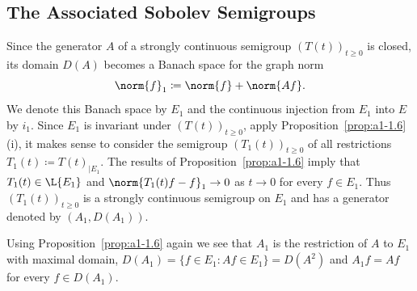 \subsection{The Associated Sobolev Semigroups}\label{subsec:a1-3.6}%
Since the generator $A$ of a strongly continuous semigroup $(T(t))_{t\geq 0}$ is closed, its domain $D(A)$ becomes a Banach space for the graph norm
\[
    \norm{f}_{1} \coloneqq \norm{f} + \norm{Af} .
\]
We denote this Banach space by $E_{1}$ and the continuous injection from $E_{1}$ into $E$ by $i_{1}$.
Since $E_{1}$ is invariant under $(T(t))_{t\geq 0}$, apply Proposition~\ref{prop:a1-1.6}\,(i), it makes sense to consider the semigroup $(T_{1}(t))_{t\geq 0}$ of all restrictions $T_{1}(t) \coloneqq T(t)_{\vert E_{1}}$.
The results of Proposition~\ref{prop:a1-1.6} imply that $T_{1}(t) \in \L{E_{1}}$ and $\norm{T_{1}(t)f-f}_{1} \to 0$ as $t \to 0$ for every $f \in E_{1}$.
Thus $(T_{1}(t))_{t\geq 0}$ is a strongly continuous semigroup on $E_{1}$ and has a generator denoted by $(A_{1},D(A_{1}))$.

Using Proposition~\ref{prop:a1-1.6} again we see that $A_{1}$ is the restriction of\/ $A$ to $E_{1}$ with maximal domain, \ie
$D(A_{1}) = \{f \in E_{1} \colon Af \in E_{1}\} = D(A^{2})$ and
$A_{1}f = Af$ for every $f \in D(A_{1})$.

